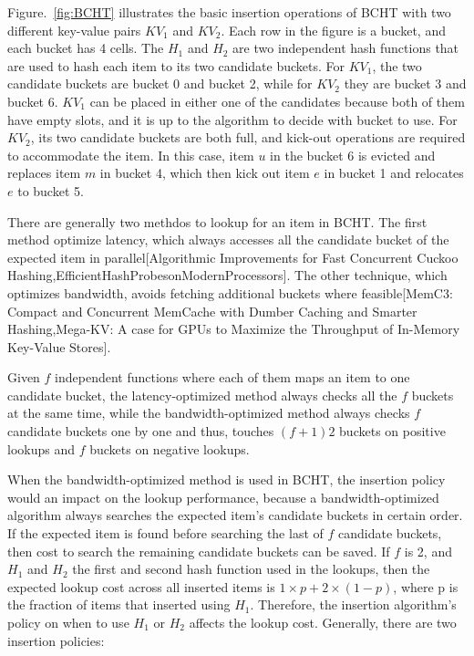 \documentclass[12pt,conference,compsoc]{IEEEtran}
\begin{document}
Figure.~\ref{fig:BCHT} illustrates the basic insertion operations of BCHT with two different key-value pairs $KV_1$ and $KV_2$. Each row in the figure is a bucket, and each bucket has 4 cells. The $H_1$ and $H_2$ are two independent hash functions that are used to hash each item to its two candidate buckets. For $KV_1$, the two candidate buckets are bucket 0 and bucket 2, while for $KV_2$ they are bucket 3 and bucket 6. $KV_1$ can be placed in either one of the candidates because both of them have empty slots, and it is up to the algorithm to decide with bucket to use. For $KV_2$, its two candidate buckets are both full, and kick-out operations are required to accommodate the item. In this case, item $u$ in the bucket 6 is evicted and replaces item $m$ in bucket 4, which then kick out item $e$ in bucket 1 and relocates $e$ to bucket 5. 

There are generally two methdos to lookup for an item in BCHT. The first method optimize latency, which always accesses all the candidate bucket of the expected item in parallel[Algorithmic Improvements for Fast Concurrent Cuckoo Hashing,EfficientHashProbesonModernProcessors]. The other technique, which optimizes bandwidth, avoids fetching additional buckets where feasible[MemC3: Compact and Concurrent MemCache with Dumber Caching and Smarter Hashing,Mega-KV: A case for GPUs to Maximize the Throughput of In-Memory Key-Value Stores].

Given $f$ independent functions where each of them maps an item to one candidate bucket, the latency-optimized method always checks all the $f$ buckets at the same time, while the bandwidth-optimized method always checks $f$ candidate buckets one by one and thus, touches $(f+1)2$ buckets on positive lookups and $f$ buckets on negative lookups.

When the bandwidth-optimized method is used in BCHT, the insertion policy would an impact on the lookup performance, because a bandwidth-optimized algorithm always searches the expected item's candidate buckets in certain order. If the expected item is found before searching the last of $f$ candidate buckets, then cost to search the remaining candidate buckets can be saved. If $f$ is 2, and $H_1$ and $H_2$ the first and second hash function used in the lookups, then the expected lookup cost across all inserted items is $1\times p+2\times (1-p)$, where p is the fraction of items that inserted using $H_1$. Therefore, the insertion algorithm's policy on when to use $H_1$ or $H_2$ affects the lookup cost. Generally, there are two insertion policies:
\end{document}
